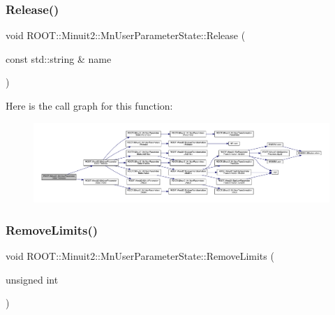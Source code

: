 \mbox{\label{classROOT_1_1Minuit2_1_1MnUserParameterState_ae35c9bfa1e967c16542143a99a6f03eb}} 
\subsubsection{\texorpdfstring{Release()}{Release()}\hspace{0.1cm}{\footnotesize\ttfamily [4/4]}}
{\footnotesize\ttfamily void R\+O\+O\+T\+::\+Minuit2\+::\+Mn\+User\+Parameter\+State\+::\+Release (\begin{DoxyParamCaption}\item[{const std\+::string \&}]{name }\end{DoxyParamCaption})}

Here is the call graph for this function\+:\nopagebreak
\begin{figure}[H]
\begin{center}
\leavevmode
\includegraphics[width=350pt]{d3/de0/classROOT_1_1Minuit2_1_1MnUserParameterState_ae35c9bfa1e967c16542143a99a6f03eb_cgraph}
\end{center}
\end{figure}
\mbox{\label{classROOT_1_1Minuit2_1_1MnUserParameterState_a1ae57d606384e08b0e710c4908543524}} 
\subsubsection{\texorpdfstring{RemoveLimits()}{RemoveLimits()}\hspace{0.1cm}{\footnotesize\ttfamily [1/4]}}
{\footnotesize\ttfamily void R\+O\+O\+T\+::\+Minuit2\+::\+Mn\+User\+Parameter\+State\+::\+Remove\+Limits (\begin{DoxyParamCaption}\item[{unsigned int}]{ }\end{DoxyParamCaption})}

